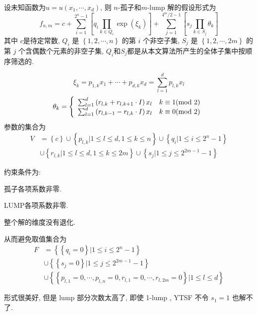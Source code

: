 \documentclass{article}
\newcommand{\sbrace}[1]{\left(#1\right)}
\newcommand{\mbrace}[1]{\left[#1\right]}
\newcommand{\bbrace}[1]{\left\{#1\right\}}
\begin{document}
设未知函数为$u=u(x_1,\cdots,x_d)$, 则 $n$-孤子和$m$-lump 解的假设形式为
\begin{equation}
    f_{n,m}=c+\sum_{i=1}^{2^n-1}\mbrace{q_i\prod_{k\in Q_i}{\exp(\xi_k)}}+\sum_{j=1}^{4^m/2-1}\mbrace{s_j\prod_{k \in S_j}{\theta_k}}
\end{equation}
其中 $c$是待定常数, $Q_i$ 是 $\bbrace{1,2,\cdots,n}$ 的第 $i$ 个非空子集, $S_j$ 是 $\bbrace{1,2,\cdots,2m}$ 的第 $j$ 个含偶数个元素的非空子集, $Q_i$和$S_j$都是从本文算法所产生的全体子集中按顺序筛选的. 

\begin{equation}
    \xi_k=p_{1,k}x_1+\cdots+p_{d,k}x_d=\sum_{l=1}^d{p_{l,k}x_l}
\end{equation}
\begin{equation}
    \theta_k=\left\{\begin{array}{ll}
        \sum_{l=1}^d{\sbrace{r_{l,k}+r_{l,k+1}\cdot I}x_l} & k \equiv 1 ({\rm mod~} 2)   \\ 
        \sum_{l=1}^d{\sbrace{r_{l,k-1}-r_{l,k}\cdot I}x_l} & k \equiv 0 ({\rm mod~} 2) \\ 
    \end{array}\right.
\end{equation}
参数的集合为
\begin{equation}
\begin{aligned}
V&=\bbrace{c}\cup\bbrace{p_{l,k}|1\le l\le d, 1\le k \le n}\cup \bbrace{q_i|1\le i \le 2^n-1}\\
 &\cup\bbrace{r_{l,k}|1\le l \le d,1\le k \le 2m}\cup\bbrace{s_j|1\le j \le 2^{2m-1}-1}
\end{aligned}
\end{equation}

约束条件为:
\begin{compactitem}[\textbullet]
\item 孤子各项系数非零.
\item LUMP各项系数非零.
\item 整个解的维度没有退化.
\end{compactitem}

从而避免取值集合为
\begin{equation}
\begin{aligned}
F&=\bbrace{\bbrace{q_i=0}|1\le i \le 2^n-1} \\
&\cup\bbrace{\bbrace{s_j=0}|1\le j \le 2^{2m-1}-1} \\
&\cup\bbrace{\bbrace{p_{l,1}=0,\cdots,p_{l,n}=0,r_{l,1}=0,\cdots,r_{l,2m}=0}|1\le l \le d}
\end{aligned}
\end{equation}

形式很美好, 但是 lump 部分次数太高了, 即使 1-lump , YTSF 不令 $s_1=1$ 也解不了. 
\end{document}
